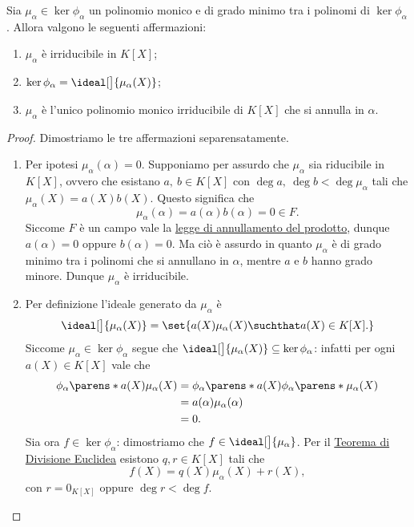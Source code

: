 \begin{proposition}\label{prop:caratt_polinomio_minimo}
    Sia $\mu_\alpha \in \ker \phi_\alpha$ un polinomio monico e di grado minimo tra i polinomi di $\ker \phi_\alpha$. Allora valgono le seguenti affermazioni:
    \begin{enumerate}[label={(\roman*)}]
        \item $\mu_\alpha$ è irriducibile in $K[X]$;
        \item $\ker \phi_\alpha = \ideal[\big]{\mu_\alpha(X)}$;
        \item $\mu_\alpha$ è l'unico polinomio monico irriducibile di $K[X]$ che si annulla in $\alpha$.
    \end{enumerate}
\end{proposition}
\begin{proof}
    Dimostriamo le tre affermazioni separensatamente.
    \begin{enumerate}[label={(\roman*)}]
        \item Per ipotesi $\mu_\alpha(\alpha) = 0$. Supponiamo per assurdo che $\mu_\alpha$ sia riducibile in $K[X]$, ovvero che esistano $a,\ b \in K[X]$ con $\deg a,\ \deg b < \deg \mu_\alpha$ tali che $\mu_\alpha(X) = a(X)b(X)$.
        Questo significa che \[
            \mu_\alpha(\alpha) = a(\alpha)b(\alpha) = 0 \in F.
        \] Siccome $F$ è un campo vale la \hyperref[prop:ann_prod_dominio]{legge di annullamento del prodotto}, dunque $a(\alpha) = 0$ oppure $b(\alpha) = 0$. Ma ciò è assurdo in quanto $\mu_\alpha$ è di grado minimo tra i polinomi che si annullano in $\alpha$, mentre $a$ e $b$ hanno grado minore. Dunque $\mu_\alpha$ è irriducibile.
        \item Per definizione l'ideale generato da $\mu_\alpha$ è \[
            \ideal[\big]{\mu_\alpha(X)} = \set{a(X)\mu_\alpha(X) \suchthat a(X) \in K[X].} 
        \] Siccome $\mu_\alpha \in \ker \phi_\alpha$ segue che $\ideal[\big]{\mu_\alpha(X)} \subseteq \ker \phi_\alpha$: infatti per ogni $a(X) \in K[X]$ vale che \begin{align*}
            \phi_\alpha\parens*{a(X)\mu_\alpha(X)} &= \phi_\alpha\parens*{a(X)}\phi_\alpha\parens*{\mu_\alpha(X)}\\
            &= a(\alpha)\mu_\alpha(\alpha)\\
            &= 0.
        \end{align*}
        Sia ora $f \in \ker \phi_\alpha$: dimostriamo che $f \in \ideal[\big]{\mu_\alpha}$. Per il \hyperref[th:divisione_euclidea_KX]{Teorema di Divisione Euclidea} esistono $q, r \in K[X]$ tali che \[
            f(X) = q(X)\mu_\alpha(X) + r(X),
        \] con $r = 0_{K[X]}$ oppure $\deg r < \deg f$.


\end{enumerate}
\end{proof}
